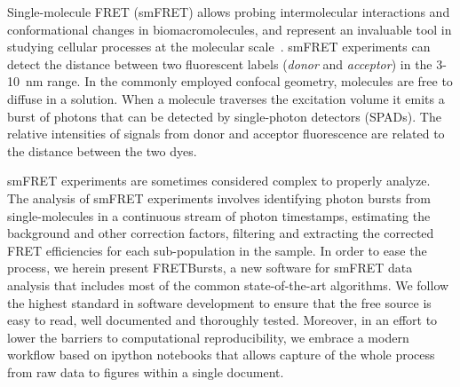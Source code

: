 Single-molecule FRET (smFRET) allows probing intermolecular interactions
and conformational changes in biomacromolecules, and represent an 
invaluable tool in studying cellular processes at the molecular 
scale~\cite{Kapanidis_2006}. smFRET experiments can detect the distance between 
two fluorescent labels (\textit{donor} and \textit{acceptor}) in the 
3-10~nm range. In the commonly employed confocal geometry, molecules are free 
to diffuse in a solution. When a molecule traverses the excitation volume it 
emits a burst of photons that can be detected by single-photon detectors (SPADs). 
The relative intensities of signals from donor and acceptor fluorescence 
are related to the distance between the two dyes.

smFRET experiments are sometimes considered complex to properly analyze. 
The analysis of smFRET experiments involves identifying photon bursts from 
single-molecules in a continuous stream of photon timestamps, estimating the 
background and other correction factors, filtering and extracting the corrected 
FRET efficiencies for each sub-population in the sample. In order to ease 
the process, we herein present FRETBursts, a new software for smFRET data 
analysis that includes most of the common state-of-the-art algorithms. 
We follow the highest standard in software development to ensure that 
the free source is easy to read, well documented and thoroughly tested. 
Moreover, in an effort to lower the barriers to computational reproducibility, 
we embrace a modern workflow based on ipython notebooks that allows capture 
of the whole process from raw data to figures within a single document.
